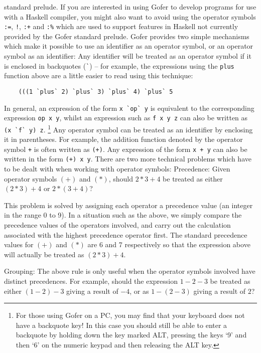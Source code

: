      standard prelude.  If you are interested in using Gofer to develop
     programs for use with a Haskell compiler, you might also  want  to
     avoid using the operator symbols \verb":=", 
     \verb"!", \verb":+" and \verb":%" which are used  to
     support features in Haskell not currently provided  by  the  Gofer
     standard prelude.
\EI
Gofer provides two simple mechanisms which make it possible to  use  an
identifier  as  an  operator  symbol,  or  an  operator  symbol  as  an
identifier:
\BI
\IT  Any  identifier  will be treated as an  operator  symbol  if it is
     enclosed in backquotes (\verb=`=) -- for example, the  expressions  using
     the \verb"plus" function above are a little easier to read  using  this
     technique:
\begin{verbatim}
    (((1 `plus` 2) `plus` 3) `plus` 4) `plus` 5
\end{verbatim}
     In general, an expression of the form \verb"x `op` y" is equivalent  to
     the corresponding expression \verb"op x y", whilst an  expression  such
     as \verb"f x y z" can also be written as \verb"(x `f` y) z".%
     \footnote{For those using Gofer on a  PC,  you  may  find  that  your
     keyboard does not have a backquote key!  In this case  you  should
     still be able to enter a backquote by holding down the key  marked
     ALT, pressing the keys `9' and then `6' on the numeric keypad  and
     then releasing the ALT key.}
\IT  Any  operator symbol  can be treated as an identifier by enclosing
     it in parentheses.  For example, the addition function denoted  by
     the operator symbol \verb"+" is often written as \verb"(+)".
     Any expression
     of the form \verb"x + y" can also be written in the form \verb"(+) x y".
\EI
There are two more technical problems which have to be dealt with  when
working with operator symbols:
\BI
\IT  Precedence: Given operator symbols $(+)$ and 
     $(*)$, should $2*3+4$
     be treated as either $(2*3)+4$ or $2*(3+4)$?

     This problem is solved by assigning  each  operator  a  precedence
     value (an integer in the range 0 to 9).  In a  situation  such  as
     the  above,  we  simply  compare  the  precedence  values  of  the
     operators involved, and carry out  the  calculation  associated
     with  the  highest  precedence  operator  first.    The   standard
     precedence values for $(+)$ and $(*)$
     are 6 and 7 respectively so that
     the expression above will actually be treated as $(2*3)+4$.

\IT  Grouping: The above rule  is only useful when the operator symbols
     involved have  distinct  precedences.   For  example,  should  the
     expression $1-2-3$ be treated as either
     $(1-2)-3$ giving a
     result of $-4$, or as $1-(2-3)$ giving a result of $2$?

